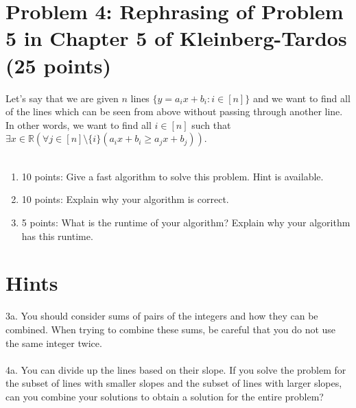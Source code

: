 \documentclass[12pt]{article}
\begin{document}
\section*{Problem 4: Rephrasing of Problem 5 in Chapter 5 of Kleinberg-Tardos (25 points)}
Let's say that we are given $n$ lines $\{y = {a_i}x + b_i: i \in [n]\}$ and we want to find all of the lines which can be seen from above without passing through another line. In other words, we want to find all $i \in [n]$ such that $\exists x \in \mathbb{R} \left(\forall j \in [n] \setminus \{i\} ({a_i}x + b_i \geq {a_j}x + b_j)\right)$.\\
\\
\begin{enumerate}
\item[(a)] 10 points: Give a fast algorithm to solve this problem. Hint is available.
\item[(b)] 10 points: Explain why your algorithm is correct.
\item[(c)] 5 points: What is the runtime of your algorithm? Explain why your algorithm has this runtime.
\end{enumerate}
\newpage
\section*{Hints}
3a. You should consider sums of pairs of the integers and how they can be combined. When trying to combine these sums, be careful that you do not use the same integer twice.\\
\\
4a. You can divide up the lines based on their slope. If you solve the problem for the subset of lines with smaller slopes and the subset of lines with larger slopes, can you combine your solutions to obtain a solution for the entire problem?
\end{document}
